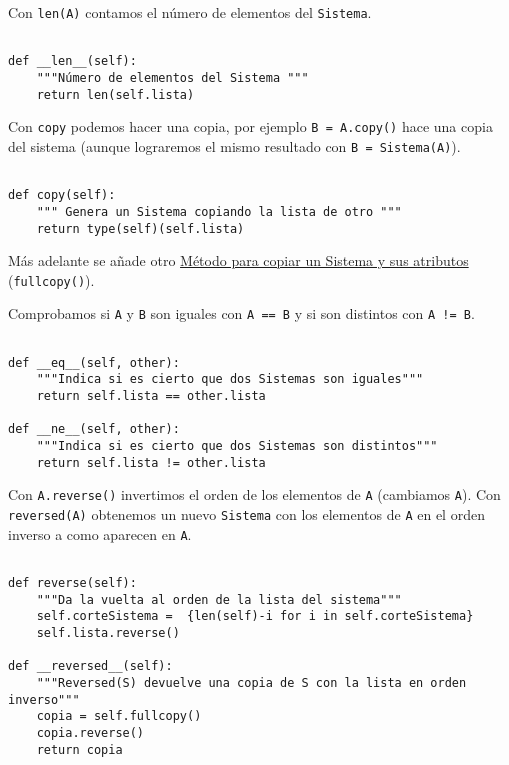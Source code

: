 \documentclass[11pt]{report}
\begin{document}
Con \texttt{len(A)} contamos el número de elementos del \texttt{Sistema}. 

\begin{verbatim}

def __len__(self):
    """Número de elementos del Sistema """
    return len(self.lista)

\end{verbatim}

Con \texttt{copy} podemos hacer una copia, por ejemplo \texttt{B = A.copy()} hace
una copia del sistema  (aunque lograremos el mismo resultado con
\texttt{B = Sistema(A)}).

\begin{verbatim}

def copy(self):
    """ Genera un Sistema copiando la lista de otro """
    return type(self)(self.lista)

\end{verbatim}

Más adelante se añade otro \hyperref[sec:org6a210c6]{Método para copiar un Sistema y sus atributos} (\texttt{fullcopy()}).

Comprobamos si \texttt{A} y \texttt{B} son iguales con \texttt{A == B} y si son distintos con
\texttt{A != B}.

\begin{verbatim}

def __eq__(self, other):
    """Indica si es cierto que dos Sistemas son iguales"""
    return self.lista == other.lista

def __ne__(self, other):
    """Indica si es cierto que dos Sistemas son distintos"""
    return self.lista != other.lista

\end{verbatim}

Con \texttt{A.reverse()} invertimos el orden de los elementos de \texttt{A}
(cambiamos \texttt{A}). Con \texttt{reversed(A)} obtenemos un nuevo \texttt{Sistema} con
los elementos de \texttt{A} en el orden inverso a como aparecen en \texttt{A}.

\begin{verbatim}

def reverse(self):
    """Da la vuelta al orden de la lista del sistema"""
    self.corteSistema =  {len(self)-i for i in self.corteSistema}
    self.lista.reverse()
    
def __reversed__(self):
    """Reversed(S) devuelve una copia de S con la lista en orden inverso"""
    copia = self.fullcopy()
    copia.reverse()
    return copia
    
\end{verbatim}
\end{document}

